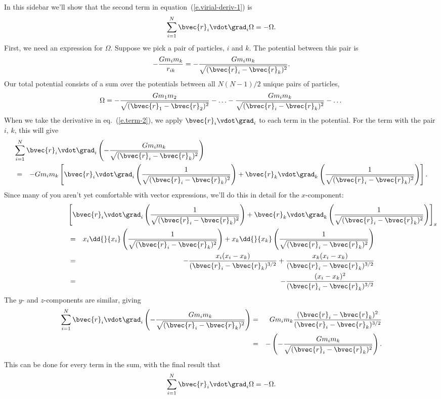 \begin{sidebar}
\label{b.working-vectors}
In this sidebar we'll show that the second term in equation~(\ref{e.virial-deriv-1}) is
\begin{equation}\label{e.term-2}
	\sum_{i=1}^{N}\bvec{r}_{i}\vdot\grad_{i}\Omega = -\Omega.
\end{equation}
First, we need an expression for $\Omega$. Suppose we pick a pair of particles, $i$ and $k$.  The potential between this pair is
\[
	-\frac{Gm_{i}m_{k}}{r_{ik}} = -\frac{Gm_{i}m_{k}}{\sqrt{(\bvec{r}_{i}-\bvec{r}_{k})^{2}}}.
\]
Our total potential consists of a sum over the potentials between all $N(N-1)/2$ unique pairs of particles,
\[
	\Omega = -\frac{Gm_{1}m_{2}}{\sqrt{(\bvec{r}_{1}-\bvec{r}_{2})^{2}}} - \ldots 
	-\frac{Gm_{i}m_{k}}{\sqrt{(\bvec{r}_{i}-\bvec{r}_{k})^{2}}} - \dots
\]
When we take the derivative in eq.~(\ref{e.term-2}), we apply $\bvec{r}_{i}\vdot\grad_{i}$ to each term in the potential.  For the term with the pair $i$, $k$, this will give
\begin{eqnarray*}
	\lefteqn{\sum_{i=1}^{N}\bvec{r}_{i}\vdot\grad_{i}\left(-\frac{Gm_{i}m_{k}}{\sqrt{(\bvec{r}_{i}-\bvec{r}_{k})^{2}}}\right)} \\
	&=& -Gm_{i}m_{k}\left[\bvec{r}_{i}\vdot\grad_{i}\left(\frac{1}{\sqrt{(\bvec{r}_{i}-\bvec{r}_{k})^{2}}}\right) + \bvec{r}_{k}\vdot\grad_{k}\left(\frac{1}{\sqrt{(\bvec{r}_{i}-\bvec{r}_{k})^{2}}}\right)\right].
\end{eqnarray*}
Since many of you aren't yet comfortable with vector expressions, we'll do this in detail for the $x$-component:
\begin{eqnarray*}
	\lefteqn{\left[\bvec{r}_{i}\vdot\grad_{i}\left(\frac{1}{\sqrt{(\bvec{r}_{i}-\bvec{r}_{k})^{2}}}\right) + \bvec{r}_{k}\vdot\grad_{k}\left(\frac{1}{\sqrt{(\bvec{r}_{i}-\bvec{r}_{k})^{2}}}\right)\right]_{x}}\\
	&=& x_{i}\dd{}{x_{i}}\left(\frac{1}{\sqrt{(\bvec{r}_{i}-\bvec{r}_{k})^{2}}}\right)
		+ x_{k}\dd{}{x_{k}}\left(\frac{1}{\sqrt{(\bvec{r}_{i}-\bvec{r}_{k})^{2}}}\right) \\
		&=& -\frac{x_{i}(x_{i}-x_{k})}{(\bvec{r}_{i}-\bvec{r}_{k})^{3/2}}
		+ \frac{x_{k}(x_{i}-x_{k})}{(\bvec{r}_{i}-\bvec{r}_{k})^{3/2}}\\
		&=& -\frac{(x_{i}-x_{k})^{2}}{(\bvec{r}_{i}-\bvec{r}_{k})^{3/2}}
\end{eqnarray*}
The $y$- and $z$-components are similar, giving
\begin{eqnarray*}
	\sum_{i=1}^{N}\bvec{r}_{i}\vdot\grad_{i}\left(-\frac{Gm_{i}m_{k}}{\sqrt{(\bvec{r}_{i}-\bvec{r}_{k})^{2}}}\right) &=& Gm_{i}m_{k}
	\frac{(\bvec{r}_{i}-\bvec{r}_{k})^{2}}{(\bvec{r}_{i}-\bvec{r}_{k})^{3/2}}\\
 &=& -\left(-\frac{Gm_{i}m_{k}}{\sqrt{(\bvec{r}_{i}-\bvec{r}_{k})^{2}}}\right).
\end{eqnarray*}
This can be done for every term in the sum, with the final result that
\[
	\sum_{i=1}^{N}\bvec{r}_{i}\vdot\grad_{i}\Omega = -\Omega.
\]
\end{sidebar}

